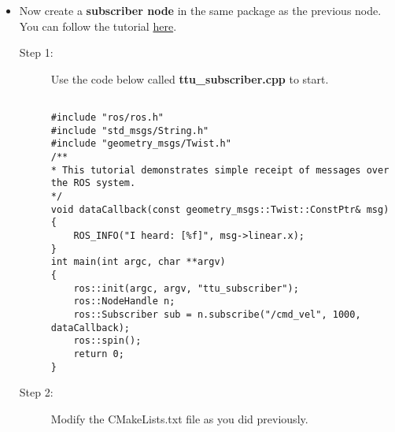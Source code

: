 \documentclass[12pt]{article}
\newcommand{\R}{\color{red}}
\newcommand{\K}{\color{black}}
\newcommand{\G}{\color{mygreen}}
\newcommand{\PR}{\color{mypurple}}
\newcommand{\pkgname}{\G<package\_name>\K}
\newcommand{\wspname}{\R<workspace\_name>\K}
\newcommand{\nodname}{\PR<node\_name>\K}
\newcommand{\tpcname}{/topic\_name}
\newcommand{\home}{\textasciitilde/}
\begin{document}
\begin{itemize}
\begin{description}
Use rostopic to view current topics. 
\begin{verbatim}  
rostopic list
\end{verbatim}

Now lets do something more fun. Turn on a turtle.
\begin{verbatim} 
rosrun turtlesim turtlesim_node
\end{verbatim}

Now start your publisher node with the cmd\textunderscore vel topic patched through to the turtle like we did previously.
\begin{verbatim} 
rosrun |\pkgname\hspace{3mm}\nodname \hspace{3mm}\tpcname|:=/turtle1/cmd_vel
\end{verbatim}
 
 \end{description}
 
\newpage

\item Now create a {\bf subscriber node} in the same package as the previous node. You can follow the tutorial \href{http://wiki.ros.org/ROS/Tutorials/WritingPublisherSubscriber(c++)} {here}. 

\begin{description}
\item [Step 1:] Use the code below called {\bf ttu\_subscriber.cpp} to start.\\

\begin{lstlisting}

#include "ros/ros.h"
#include "std_msgs/String.h"
#include "geometry_msgs/Twist.h"
/**
* This tutorial demonstrates simple receipt of messages over the ROS system.
*/
void dataCallback(const geometry_msgs::Twist::ConstPtr& msg)
{
	ROS_INFO("I heard: [%f]", msg->linear.x);
}
int main(int argc, char **argv)
{
	ros::init(argc, argv, "ttu_subscriber");
	ros::NodeHandle n;
	ros::Subscriber sub = n.subscribe("/cmd_vel", 1000, dataCallback);
	ros::spin();
	return 0;
}

\end{lstlisting}


\item [Step 2:] Modify the CMakeLists.txt file as you did previously. \\\\


\end{description}
\end{itemize}
\end{document}
